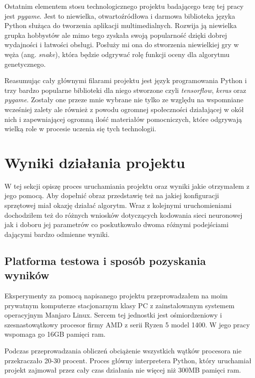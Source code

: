 \documentclass[12pt, oneside, a4paper]{report}
\begin{document}
Ostatnim elementem stosu technologicznego projektu badającego tezę tej pracy jest \textit{pygame}. Jest to niewielka, otwartoźródłowa i darmowa biblioteka języka Python służąca do tworzenia aplikacji multimedialnych. Rozwija ją niewielka grupka hobbystów ale mimo tego zyskała swoją popularność dzięki dobrej wydajności i łatwości obsługi. Posłuży mi ona do stworzenia niewielkiej gry w węża (ang. \textit{snake}), która będzie odgrywać rolę funkcji oceny dla algorytmu genetycznego.

Reasumując cały głównymi filarami projektu jest język programowania Python i trzy bardzo popularne biblioteki dla niego stworzone czyli \textit{tensorflow}, \textit{keras} oraz \textit{pygame}. Zostały one przeze mnie wybrane nie tylko ze względu na wspomniane wcześniej zalety ale również z powodu ogromnej społeczności działającej w okół nich i zapewniającej ogromną ilość materiałów pomocniczych, które odgrywają wielką role w procesie uczenia się tych technologii.


\chapter{Wyniki działania projektu}

W tej sekcji opiszę proces uruchamiania projektu oraz wyniki jakie otrzymałem z jego pomocą. Aby dopełnić obraz przedstawię też na jakiej konfiguracji sprzętowej miał okazję działać algorytm. Wraz z kolejnymi uruchomieniami dochodziłem też do różnych wniosków dotyczących kodowania sieci neuronowej jak i doboru jej parametrów co poskutkowało dwoma różnymi podejściami dającymi bardzo odmienne wyniki.

\section{Platforma testowa i sposób pozyskania wyników}

Eksperymenty za pomocą napisanego projektu przeprowadzałem na moim prywatnym komputerze stacjonarnym klasy PC z zainstalowanym systemem operacyjnym Manjaro Linux. Sercem tej jednostki jest ośmiordzeniowy i szesnastowątkowy procesor firmy AMD z serii Ryzen 5 model 1400. W jego pracy wspomaga go 16GB pamięci ram.

Podczas przeprowadzania obliczeń obciążenie wszystkich wątków procesora nie przekraczało 20-30 procent. Proces główny interpretera Python, który uruchamiał projekt zajmował przez cały czas działania nie więcej niż 300MB pamięci ram.
\end{document}
